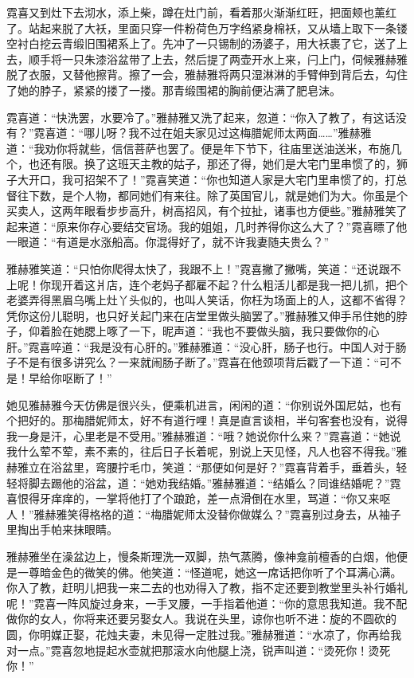 \par 霓喜又到灶下去沏水，添上柴，蹲在灶门前，看着那火渐渐红旺，把面颊也薰红了。站起来脱了大袄，里面只穿一件粉荷色万字绉紧身棉袄，又从墙上取下一条镂空衬白挖云青缎旧围裙系上了。先冲了一只锡制的汤婆子，用大袄裹了它，送了上去，顺手将一只朱漆浴盆带了上去，然后提了两壶开水上来，闩上门，伺候雅赫雅脱了衣服，又替他擦背。擦了一会，雅赫雅将两只湿淋淋的手臂伸到背后去，勾住了她的脖子，紧紧的搂了一搂。那青缎围裙的胸前便沾满了肥皂沫。
\par 霓喜道：“快洗罢，水要冷了。”雅赫雅又洗了起来，忽道：“你入了教了，有这话没有？”霓喜道：“哪儿呀？我不过在姐夫家见过这梅腊妮师太两面……”雅赫雅道：“我劝你将就些，信信菩萨也罢了。便是年下节下，往庙里送油送米，布施几个，也还有限。换了这班天主教的姑子，那还了得，她们是大宅门里串惯了的，狮子大开口，我可招架不了！”霓喜笑道：“你也知道人家是大宅门里串惯了的，打总督往下数，是个人物，都同她们有来往。除了英国官儿，就是她们为大。你虽是个买卖人，这两年眼看步步高升，树高招风，有个拉扯，诸事也方便些。”雅赫雅笑了起来道：“原来你存心要结交官场。我的姐姐，几时养得你这么大了？”霓喜瞟了他一眼道：“有道是水涨船高。你混得好了，就不许我妻随夫贵么？”
\par 雅赫雅笑道：“只怕你爬得太快了，我跟不上！”霓喜撇了撇嘴，笑道：“还说跟不上呢！你现开着这爿店，连个老妈子都雇不起？什么粗活儿都是我一把儿抓，把个老婆弄得黑眉乌嘴上灶丫头似的，也叫人笑话，你枉为场面上的人，这都不省得？凭你这份儿聪明，也只好关起门来在店堂里做头脑罢了。”雅赫雅又伸手吊住她的脖子，仰着脸在她腮上啄了一下，昵声道：“我也不要做头脑，我只要做你的心肝。”霓喜啐道：“我是没有心肝的。”雅赫雅道：“没心肝，肠子也行。中国人对于肠子不是有很多讲究么？一来就闹肠子断了。”霓喜在他颈项背后戳了一下道：“可不是！早给你呕断了！”
\par 她见雅赫雅今天仿佛是很兴头，便乘机进言，闲闲的道：“你别说外国尼姑，也有个把好的。那梅腊妮师太，好不有道行哩！真是直言谈相，半句客套也没有，说得我一身是汗，心里老是不受用。”雅赫雅道：“哦？她说你什么来？”霓喜道：“她说我什么荤不荤，素不素的，往后日子长着呢，别说上天见怪，凡人也容不得我。”雅赫雅立在浴盆里，弯腰拧毛巾，笑道：“那便如何是好？”霓喜背着手，垂着头，轻轻将脚去踢他的浴盆，道：“她劝我结婚。”雅赫雅道：“结婚么？同谁结婚呢？”霓喜恨得牙痒痒的，一掌将他打了个踉跄，差一点滑倒在水里，骂道：“你又来呕人！”雅赫雅笑得格格的道：“梅腊妮师太没替你做媒么？”霓喜别过身去，从袖子里掏出手帕来抹眼睛。
\par 雅赫雅坐在澡盆边上，慢条斯理洗一双脚，热气蒸腾，像神龛前檀香的白烟，他便是一尊暗金色的微笑的佛。他笑道：“怪道呢，她这一席话把你听了个耳满心满。你入了教，赶明儿把我一来二去的也劝得入了教，指不定还要到教堂里头补行婚礼呢！”霓喜一阵风旋过身来，一手叉腰，一手指着他道：“你的意思我知道。我不配做你的女人，你将来还要另娶女人。我说在头里，谅你也听不进：旋的不圆砍的圆，你明媒正娶，花烛夫妻，未见得一定胜过我。”雅赫雅道：“水凉了，你再给我对一点。”霓喜忽地提起水壶就把那滚水向他腿上浇，锐声叫道：“烫死你！烫死你！”
